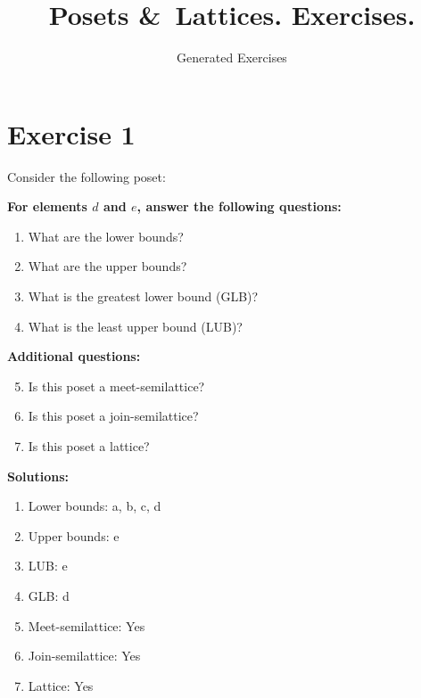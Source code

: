 \documentclass{article}
\begin{document}
\title{Posets \&\ Lattices. Exercises.}
\author{Generated Exercises}
\maketitle
\newpage
\section*{Exercise 1}
Consider the following poset:
\begin{center}
\end{center}

    \textbf{For elements $d$ and $e$, answer the following questions:}
\begin{enumerate}
    \item What are the lower bounds?
    \item What are the upper bounds?
    \item What is the greatest lower bound (GLB)?
    \item What is the least upper bound (LUB)?
\end{enumerate}
    \hspace*{3ex} \textbf{Additional questions:}
\begin{enumerate}
    \setcounter{enumi}{4}
    \item Is this poset a meet-semilattice?
    \item Is this poset a join-semilattice?
    \item Is this poset a lattice?
\end{enumerate}

\textbf{Solutions:}
\begin{enumerate}
    \item Lower bounds: {a, b, c, d}
    \item Upper bounds: {e}
    \item LUB: e
    \item GLB: d
    \item Meet-semilattice: Yes
    \item Join-semilattice: Yes
    \item Lattice: Yes
\end{enumerate}
\newpage
\end{document}
